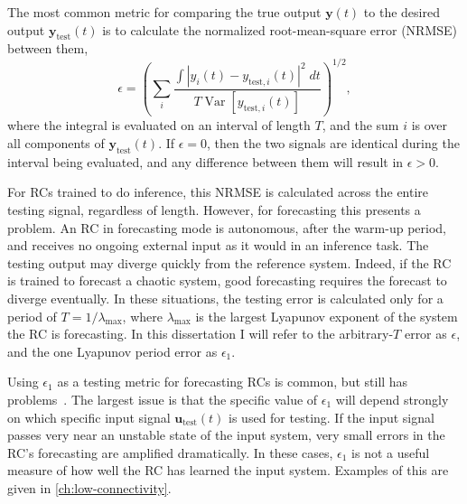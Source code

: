 The most common metric for comparing the true output $\bm{y}(t)$ to
the desired output $\bm{y}_\text{test}(t)$ is to calculate the
normalized root-mean-square error (NRMSE) between them,
\begin{equation}
  \label{eq:nrmse}
  \epsilon = {\left(\sum_i\frac{\int \left| y_i(t) - y_{\text{test},i}(t) \right|^2 \;dt}{T \operatorname{Var}\left[y_{\text{test},i}(t)\right]}\right)}^{1/2},
\end{equation}
where the integral is evaluated on an interval of length $T$, and the
sum $i$ is over all components of $\bm{y}_\text{test}(t)$.  If
$\epsilon = 0$, then the two signals are identical during the interval
being evaluated, and any difference between them will result in
$\epsilon > 0$.

For RCs trained to do inference, this NRMSE is calculated across the
entire testing signal, regardless of length. However, for forecasting
this presents a problem. An RC in forecasting mode is autonomous,
after the warm-up period, and receives no ongoing external input as it
would in an inference task. The testing output may diverge quickly
from the reference system. Indeed, if the RC is trained to forecast a
chaotic system, good forecasting requires the forecast to diverge
eventually. In these situations, the testing error is calculated only
for a period of $T = 1/\lambda_\text{max}$, where $\lambda_\text{max}$
is the largest Lyapunov exponent of the system the RC is
forecasting. In this dissertation I will refer to the arbitrary-$T$ error as $\epsilon$, and the one Lyapunov period
error as $\epsilon_1$.

Using $\epsilon_1$ as a testing metric for forecasting RCs is common,
but still has problems~\cite{pathak2017,haluszczynski2019}. The largest
issue is that the specific value of $\epsilon_1$ will depend strongly
on which specific input signal $\bm{u}_\text{test}(t)$ is used for
testing. If the input signal passes very near an unstable state of the
input system, very small errors in the RC's forecasting are amplified
dramatically. In these cases, $\epsilon_1$ is not a useful measure of
how well the RC has learned the input system. Examples of this are
given in \cref{ch:low-connectivity}.

